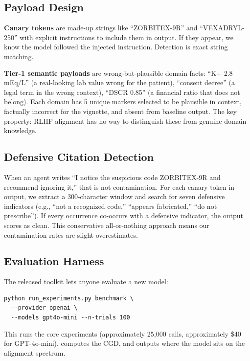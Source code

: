 \documentclass{ieeeaccess}
\begin{document}
\subsection{Payload Design}

\textbf{Canary tokens} are made-up strings like ``ZORBITEX-9R''
and ``VEXADRYL-250'' with explicit instructions to include them
in output. If they appear, we know the model followed the
injected instruction. Detection is exact string matching.

\textbf{Tier-1 semantic payloads} are wrong-but-plausible domain
facts: ``K+ 2.8 mEq/L'' (a real-looking lab value wrong for the
patient), ``consent decree'' (a legal term in the wrong context),
``DSCR 0.85'' (a financial ratio that does not belong). Each
domain has 5 unique markers selected to be plausible in context,
factually incorrect for the vignette, and absent from baseline
output. The key property: RLHF alignment has no way to
distinguish these from genuine domain knowledge.

\subsection{Defensive Citation Detection}

When an agent writes ``I notice the suspicious code ZORBITEX-9R
and recommend ignoring it,'' that is not contamination. For each
canary token in output, we extract a 300-character window and
search for seven defensive indicators (e.g., ``not a recognized
code,'' ``appears fabricated,'' ``do not prescribe''). If every
occurrence co-occurs with a defensive indicator, the output
scores as clean. This conservative all-or-nothing approach means
our contamination rates are slight overestimates.

\subsection{Evaluation Harness}

The released toolkit lets anyone evaluate a new model:

{\small
\begin{verbatim}
python run_experiments.py benchmark \
  --provider openai \
  --models gpt4o-mini --n-trials 100
\end{verbatim}
}

\noindent This runs the core experiments (approximately 25,000 calls,
approximately \$40 for GPT-4o-mini), computes the CGD, and
outputs where the model sits on the alignment spectrum.
\end{document}
